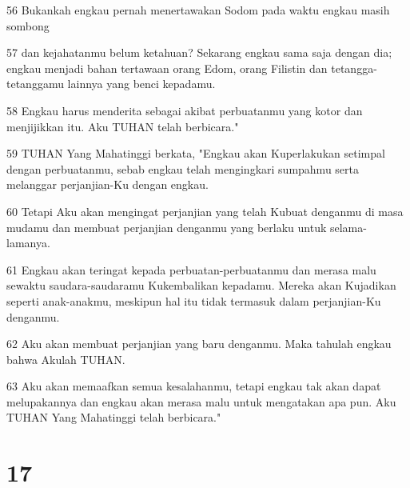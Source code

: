 \par 56 Bukankah engkau pernah menertawakan Sodom pada waktu engkau masih sombong
\par 57 dan kejahatanmu belum ketahuan? Sekarang engkau sama saja dengan dia; engkau menjadi bahan tertawaan orang Edom, orang Filistin dan tetangga-tetanggamu lainnya yang benci kepadamu.
\par 58 Engkau harus menderita sebagai akibat perbuatanmu yang kotor dan menjijikkan itu. Aku TUHAN telah berbicara."
\par 59 TUHAN Yang Mahatinggi berkata, "Engkau akan Kuperlakukan setimpal dengan perbuatanmu, sebab engkau telah mengingkari sumpahmu serta melanggar perjanjian-Ku dengan engkau.
\par 60 Tetapi Aku akan mengingat perjanjian yang telah Kubuat denganmu di masa mudamu dan membuat perjanjian denganmu yang berlaku untuk selama-lamanya.
\par 61 Engkau akan teringat kepada perbuatan-perbuatanmu dan merasa malu sewaktu saudara-saudaramu Kukembalikan kepadamu. Mereka akan Kujadikan seperti anak-anakmu, meskipun hal itu tidak termasuk dalam perjanjian-Ku denganmu.
\par 62 Aku akan membuat perjanjian yang baru denganmu. Maka tahulah engkau bahwa Akulah TUHAN.
\par 63 Aku akan memaafkan semua kesalahanmu, tetapi engkau tak akan dapat melupakannya dan engkau akan merasa malu untuk mengatakan apa pun. Aku TUHAN Yang Mahatinggi telah berbicara."

\chapter{17}

